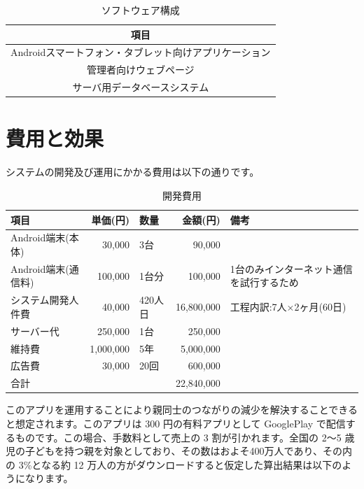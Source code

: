 \documentclass[a4j]{jarticle}
\begin{document}
\begin{table}[H]
    \caption{ソフトウェア構成}
    \label{tbl: table_software}
    \begin{center}
        \begin{tabular}{|c|} \hline
            項目 \\ \hline
            Androidスマートフォン・タブレット向けアプリケーション \\ \hline
            管理者向けウェブページ \\ \hline
            サーバ用データベースシステム \\ \hline
        \end{tabular}
    \end{center}
\end{table}

\section{費用と効果}
システムの開発及び運用にかかる費用は以下の通りです。
　\begin{table}[H]
\begin{center}
  \caption{開発費用}
  \begin{tabular}{|l|r|l|r|l|}\hline
    項目& 単価(円) & 数量 & 金額(円) & 備考  \\ \hline
    Android端末(本体)& 30,000 & 3台 & 90,000 & 　 \\ \hline
    Android端末(通信料)& 100,000 & 1台分 & 100,000 & 1台のみインターネット通信を試行するため  \\ \hline
    システム開発人件費& 40,000 & 420人日 & 16,800,000 & 工程内訳:7人×2ヶ月(60日)  \\ \hline
    サーバー代& 250,000 & 1台 & 250,000 & 　 \\ \hline
    維持費& 1,000,000 & 5年 & 5,000,000 & 　　  \\ \hline
    広告費& 30,000 & 20回 & 600,000 & 　　  \\ \hline
    \multicolumn{3}{|l|}{合計} & 22,840,000 &　 \\ \hline
  \end{tabular}
\end{center}
\end{table}

このアプリを運用することにより親同士のつながりの減少を解決することできると想定されます。このアプリは 300 円の有料アプリとして GooglePlay で配信するものです。この場合、手数料として売上の 3 割が引かれます。全国の 2～5 歳児の子どもを持つ親を対象としており、その数はおよそ400万人であり、その内の 3\%となる約 12 万人の方がダウンロードすると仮定した算出結果は以下のようになります。
\end{document}
